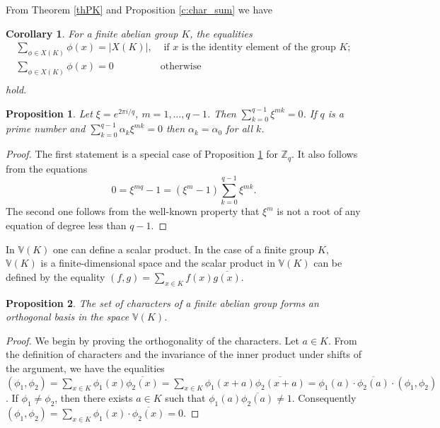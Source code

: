 \documentclass[11pt]{article}
\newtheorem{claim}{Proposition}[section]
\newtheorem{corollary}{Corollary}[section]
\theoremstyle{definition}
\begin{document}
{{{From Theorem \ref{thPK} and Proposition \ref{c:char_sum} we have

\begin{corollary}\label{c:char_sum1}
     For a finite abelian group $K$, the
        equalities
        \[
\begin{array}{ll}
        \sum\limits_{\phi\in X(K)}\phi(x)=|X(K)|, & \mbox{ if } x \mbox{ is the identity element of the group } K;\\
        \sum\limits_{\phi\in X(K)}\phi(x)=0\, & \mbox{otherwise}\\
\end{array}
                        \]
        hold.
\end{corollary}


\begin{claim}\label{c:char_sum11}
Let $\xi=e^{2\pi i/q}$, $m=1,\dots,q-1$. Then $\sum\limits_{k=0}^{q-1}\xi^{mk}=0$. If $q$ is a prime number and $\sum\limits_{k=0}^{q-1}\alpha_k\xi^{mk}=0$  then $\alpha_k=\alpha_0$ for all $k$.
\end{claim}
\begin{proof}
The first statement is a special case of Proposition \ref{c:char_sum1} for $\mathbb{Z}_q$. It also follows from the equations $$0=\xi^{mq}-1=(\xi^m-1)\sum\limits_{k=0}^{q-1}\xi^{mk}.$$
The second  one follows from the well-known property that $\xi^m$ is not a root of any equation of degree less than $q-1$. 
\end{proof}


In  $\mathbb{V}({K})$ one can define a scalar
product. In the case of a finite group $K$, 
$\mathbb{V}({K})$ is a finite-dimensional space and the scalar product in
$\mathbb{V}({K})$ can be defined by the equality
$(f,g)=\sum\limits_{x\in K}f(x)\overline{g(x)}$.

\begin{claim}\label{c:charact_orthonorm_basis}
    The set of characters of a finite abelian  group forms an orthogonal basis in the space $\mathbb{V}({K})$.
\end{claim}
\begin{proof}
    We begin by proving the orthogonality of the characters. Let $a\in K$. From the definition of characters and the invariance of the inner product under shifts of the argument, we have the equalities\\
    $(\phi_1,\phi_2)=\sum\limits_{x\in K}\phi_1(x)\overline{\phi_2(x)}=
    \sum\limits_{x\in K}\phi_1(x+a)\overline{\phi_2(x+a)}=\phi_1(a)\cdot\overline{\phi_2(a)}\cdot(\phi_1,\phi_2)$.
    If $\phi_1\neq \phi_2$, then there exists $a\in K$ such that  $\phi_1(a)\overline{\phi_2(a)}\ne 1$. Consequently
     $(\phi_1,\phi_2)=\sum\limits_{x\in K}\phi_1(x)\cdot\overline{\phi_2(x)}=0$.


\end{proof}}}}
\end{document}
